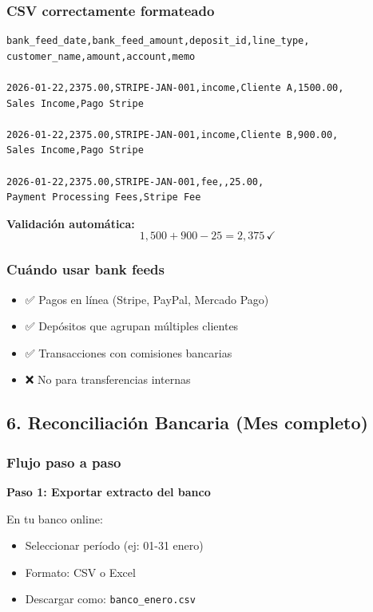 \documentclass[12pt,oneside]{article}
\begin{document}
\subsubsection{CSV correctamente formateado}

\begin{verbatim}
bank_feed_date,bank_feed_amount,deposit_id,line_type,
customer_name,amount,account,memo

2026-01-22,2375.00,STRIPE-JAN-001,income,Cliente A,1500.00,
Sales Income,Pago Stripe

2026-01-22,2375.00,STRIPE-JAN-001,income,Cliente B,900.00,
Sales Income,Pago Stripe

2026-01-22,2375.00,STRIPE-JAN-001,fee,,25.00,
Payment Processing Fees,Stripe Fee
\end{verbatim}

\textbf{Validación automática:}
$$1,500 + 900 - 25 = 2,375 \,\checkmark$$

\subsubsection{Cuándo usar bank feeds}

\begin{itemize}
    \item ✅ Pagos en línea (Stripe, PayPal, Mercado Pago)
    \item ✅ Depósitos que agrupan múltiples clientes
    \item ✅ Transacciones con comisiones bancarias
    \item ❌ No para transferencias internas
\end{itemize}

\subsection{6. Reconciliación Bancaria (Mes completo)}

\subsubsection{Flujo paso a paso}

\textbf{Paso 1: Exportar extracto del banco}

En tu banco online:
\begin{itemize}
    \item Seleccionar período (ej: 01-31 enero)
    \item Formato: CSV o Excel
    \item Descargar como: \texttt{banco\_enero.csv}
\end{itemize}
\end{document}
